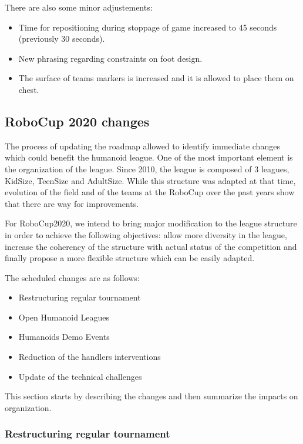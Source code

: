\documentclass{article}
\begin{document}
There are also some minor adjustements:

\begin{itemize}
\item Time for repositioning during stoppage of game increased to 45 seconds (previously 30 seconds).
\item New phrasing regarding constraints on foot design.
\item The surface of teams markers is increased and it is allowed to place them on chest.
\end{itemize}

\subsection{RoboCup 2020 changes}

The process of updating the roadmap allowed to identify immediate changes which
could benefit the humanoid league.
One of the most important element is the organization of the league. Since 2010,
the league is composed of 3 leagues, KidSize, TeenSize and AdultSize.
While this structure was adapted at that time, evolution of the field and of the
teams at the RoboCup over the past years show that there are way for improvements.

For RoboCup2020, we intend to bring major modification to the league structure
in order to achieve the following objectives:
allow more diversity in the league,
increase the coherency of the structure with actual status of the competition
and finally propose a more flexible structure which can be easily adapted.

The scheduled changes are as follows:
\begin{itemize}
\item Restructuring regular tournament
\item Open Humanoid Leagues
\item Humanoids Demo Events
\item Reduction of the handlers interventions
\item Update of the technical challenges
\end{itemize}

This section starts by describing the changes and then summarize the impacts on
organization.


\subsubsection{Restructuring regular tournament}
\end{document}
